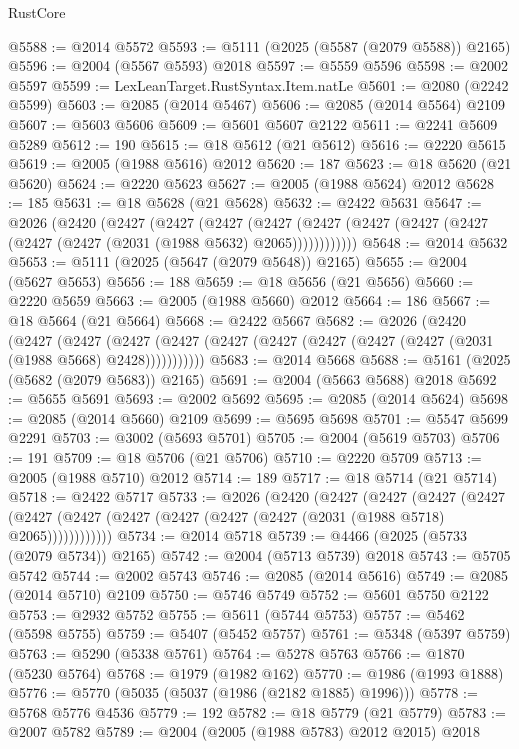 \begin{lexlean}{RustCore}
\begin{coremodule}
@5588 := @2014 @5572
@5593 := @5111 (@2025 (@5587 (@2079 @5588)) @2165)
@5596 := @2004 (@5567 @5593) @2018
@5597 := @5559 @5596
@5598 := @2002 @5597
@5599 := LexLeanTarget.RustSyntax.Item.natLe
@5601 := @2080 (@2242 @5599)
@5603 := @2085 (@2014 @5467)
@5606 := @2085 (@2014 @5564) @2109
@5607 := @5603 @5606
@5609 := @5601 @5607 @2122
@5611 := @2241 @5609 @5289
@5612 := 190
@5615 := @18 @5612 (@21 @5612)
@5616 := @2220 @5615
@5619 := @2005 (@1988 @5616) @2012
@5620 := 187
@5623 := @18 @5620 (@21 @5620)
@5624 := @2220 @5623
@5627 := @2005 (@1988 @5624) @2012
@5628 := 185
@5631 := @18 @5628 (@21 @5628)
@5632 := @2422 @5631
@5647 := @2026
    (@2420
      (@2427
        (@2427
          (@2427
            (@2427 (@2427 (@2427 (@2427 (@2427 (@2427 (@2427 (@2031 (@1988 @5632) @2065))))))))))))
@5648 := @2014 @5632
@5653 := @5111 (@2025 (@5647 (@2079 @5648)) @2165)
@5655 := @2004 (@5627 @5653)
@5656 := 188
@5659 := @18 @5656 (@21 @5656)
@5660 := @2220 @5659
@5663 := @2005 (@1988 @5660) @2012
@5664 := 186
@5667 := @18 @5664 (@21 @5664)
@5668 := @2422 @5667
@5682 := @2026
    (@2420
      (@2427
        (@2427
          (@2427 (@2427 (@2427 (@2427 (@2427 (@2427 (@2427 (@2031 (@1988 @5668) @2428)))))))))))
@5683 := @2014 @5668
@5688 := @5161 (@2025 (@5682 (@2079 @5683)) @2165)
@5691 := @2004 (@5663 @5688) @2018
@5692 := @5655 @5691
@5693 := @2002 @5692
@5695 := @2085 (@2014 @5624)
@5698 := @2085 (@2014 @5660) @2109
@5699 := @5695 @5698
@5701 := @5547 @5699 @2291
@5703 := @3002 (@5693 @5701)
@5705 := @2004 (@5619 @5703)
@5706 := 191
@5709 := @18 @5706 (@21 @5706)
@5710 := @2220 @5709
@5713 := @2005 (@1988 @5710) @2012
@5714 := 189
@5717 := @18 @5714 (@21 @5714)
@5718 := @2422 @5717
@5733 := @2026
    (@2420
      (@2427
        (@2427
          (@2427
            (@2427 (@2427 (@2427 (@2427 (@2427 (@2427 (@2427 (@2031 (@1988 @5718) @2065))))))))))))
@5734 := @2014 @5718
@5739 := @4466 (@2025 (@5733 (@2079 @5734)) @2165)
@5742 := @2004 (@5713 @5739) @2018
@5743 := @5705 @5742
@5744 := @2002 @5743
@5746 := @2085 (@2014 @5616)
@5749 := @2085 (@2014 @5710) @2109
@5750 := @5746 @5749
@5752 := @5601 @5750 @2122
@5753 := @2932 @5752
@5755 := @5611 (@5744 @5753)
@5757 := @5462 (@5598 @5755)
@5759 := @5407 (@5452 @5757)
@5761 := @5348 (@5397 @5759)
@5763 := @5290 (@5338 @5761)
@5764 := @5278 @5763
@5766 := @1870 (@5230 @5764)
@5768 := @1979 (@1982 @162)
@5770 := @1986 (@1993 @1888)
@5776 := @5770 (@5035 (@5037 (@1986 (@2182 @1885) @1996)))
@5778 := @5768 @5776 @4536
@5779 := 192
@5782 := @18 @5779 (@21 @5779)
@5783 := @2007 @5782
@5789 := @2004 (@2005 (@1988 @5783) @2012 @2015) @2018

\end{coremodule}
\end{lexlean}
